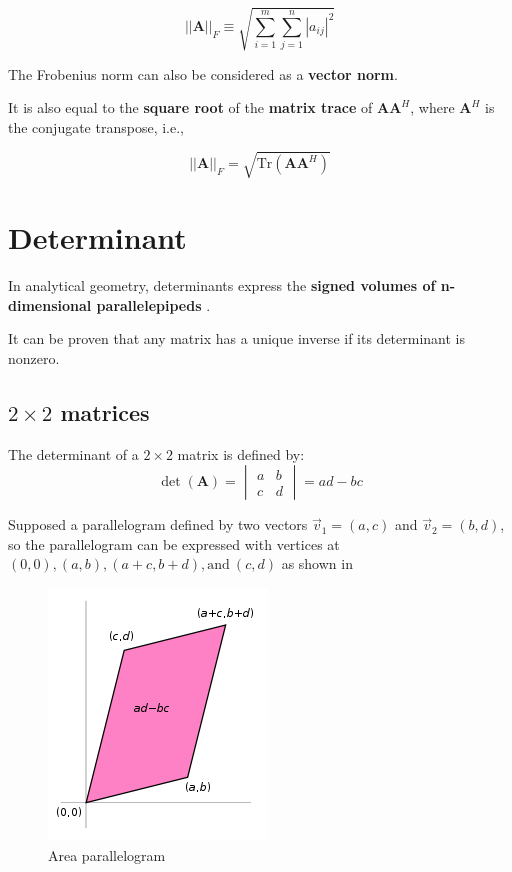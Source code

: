 \begin{equation}
||\mathbf{A}||_F \equiv \sqrt{\sum_{i=1}^{m}\sum_{j=1}^{n}|a_{ij}|^2}
\end{equation}

The Frobenius norm can also be considered as a \textbf{vector norm}.

It is also equal to the \textbf{square root} of the \textbf{matrix trace} of $ \mathbf{AA}^H $, where $ \mathbf{A}^H $ is the conjugate transpose, i.e.,

\begin{equation}
||\mathbf{A}||_F = \sqrt{\mathrm{Tr}(\mathbf{AA}^H)}
\end{equation}

\section{Determinant}
In analytical geometry, determinants express the \textbf{signed volumes of n-dimensional parallelepipeds} .

It can be proven that any matrix has a unique inverse if its determinant is nonzero.

\subsection{$ 2\times 2 $ matrices}
The determinant of a $ 2\times 2 $ matrix is defined by:
\begin{equation}
\det (\mathbf{A}) = \begin{vmatrix}
a & b \\
c & d
\end{vmatrix} = ad-bc
\end{equation}

Supposed a parallelogram defined by two vectors $ \vec{v}_1 = (a,c) $ and $ \vec{v}_2=(b,d) $, so the parallelogram can be expressed with vertices at $ (0,0), (a,b), (a+c, b+d), \mathrm{and~} (c,d) $ as shown in 

\begin{figure}[h]
	\centering
	\includegraphics[scale=0.5]{Area_parallellogram_as_determinant}
	\caption{Area parallelogram}
	\label{fig:Area_parallellogram_as_determinant}
\end{figure}

